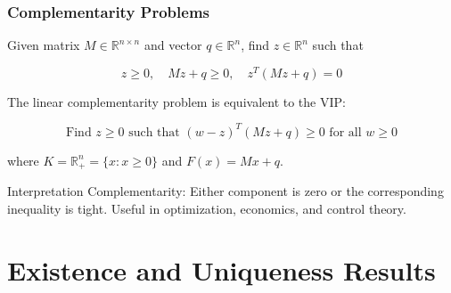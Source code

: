 \documentclass[aspectratio=169,10pt]{beamer}
\begin{document}
\begin{frame}
\frametitle{Complementarity Problems}

\vspace{0.2cm}

\begin{definition}
Given matrix $M \in \mathbb{R}^{n \times n}$ and vector $q \in \mathbb{R}^n$, find $z \in \mathbb{R}^n$ such that

\[
z \geq 0, \quad Mz + q \geq 0, \quad z^T(Mz + q) = 0
\]
\end{definition}

\vspace{0.3cm}

\begin{theorem}
The linear complementarity problem is equivalent to the VIP:

\[
\text{Find } z \geq 0 \text{ such that } (w - z)^T(Mz + q) \geq 0 \text{ for all } w \geq 0
\]

where $K = \mathbb{R}^n_+ = \{x : x \geq 0\}$ and $F(x) = Mx + q$.
\end{theorem}

\vspace{0.3cm}

\begin{block}{Interpretation}
Complementarity: Either component is zero or the corresponding inequality is tight.
Useful in optimization, economics, and control theory.
\end{block}

\end{frame}


\section{Existence and Uniqueness Results}
\end{document}
